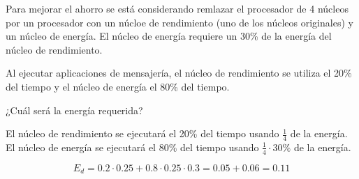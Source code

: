 \begin{acexercise}\end{acexercise}

Para mejorar el ahorro se está considerando remlazar el procesador de 4 núcleos
por un procesador con un núcloe de rendimiento (uno de los núcleos originales) y
un núcleo de energía.
El núcleo de energía requiere un 30\% de la energía del núcleo de rendimiento.

Al ejecutar aplicaciones de mensajería, el núcleo de rendimiento se utiliza el
20\% del tiempo y el núcleo de energía el 80\% del tiempo.

¿Cuál será la energía requerida?

\begin{acsolution}\end{acsolution}

El núcleo de rendimiento se ejecutará el 20\% del tiempo usando $\frac{1}{4}$  de la energía.
El núcleo de energía se ejecutará el 80\% del tiempo usando $\frac{1}{4} \cdot 30\%$ 
de la energía.

\[
E_d = 0.2 \cdot 0.25 + 0.8 \cdot 0.25 \cdot 0.3 =
0.05 + 0.06 = 
0.11
\]

